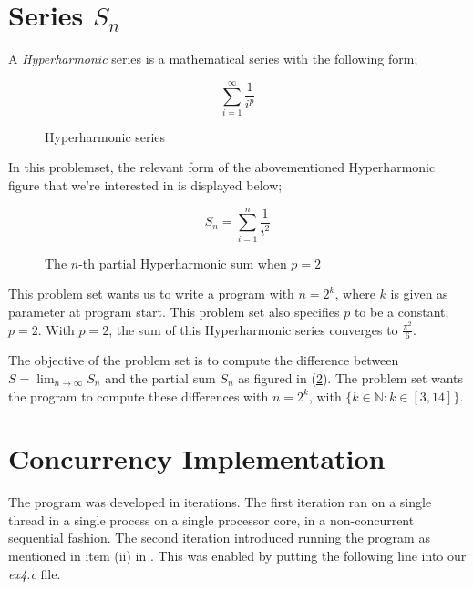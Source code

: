 \documentclass[fontsize=11pt,paper=a4,titlepage]{report}
\begin{document}

\section{Series $S_n$}

A \textit{Hyperharmonic} series is a mathematical series with the following form;

\begin{figure}[h]
	\begin{equation}
		\sum_{i=1}^{\infty} \frac{1}{i^p}
	\end{equation}
	\caption{Hyperharmonic series}
	\label{HyperSeries}
\end{figure}

In this problemset, the relevant form of the abovementioned Hyperharmonic figure
that we're interested in is displayed below;

\begin{figure}[h]
	\begin{equation}
		S_n = \sum_{i=1}^{n} \frac{1}{i^2}
	\end{equation}
	\caption{The $n$-th partial Hyperharmonic sum when $p = 2$}
	\label{HyperSum}
\end{figure}

This problem set wants us to write a program with $n = 2^k$, where $k$ is given
as parameter at program start. This
problem set also specifies $p$ to be a constant; $p = 2$. With $p = 2$, the sum
of this Hyperharmonic series converges to $\frac{\pi^2}{6}$.

The objective of the problem set is to compute the difference between $S =
\lim_{n \to \infty}S_n$ and the partial sum $S_n$ as figured in (\ref{HyperSum}).
The problem set wants the program to compute these differences with $n = 2^k$,
with $\{k \in \mathbb{N} : k \in [3, 14]\}$.

\section{Concurrency Implementation}

The program was developed in iterations. The first iteration ran on a single
thread in a single process on a single processor core, in a non-concurrent
sequential fashion. The second iteration introduced running the program as
mentioned in item (ii) in \cite{RunMode}. This was enabled by putting the following
line into our \textit{ex4.c} file.
\end{document}

